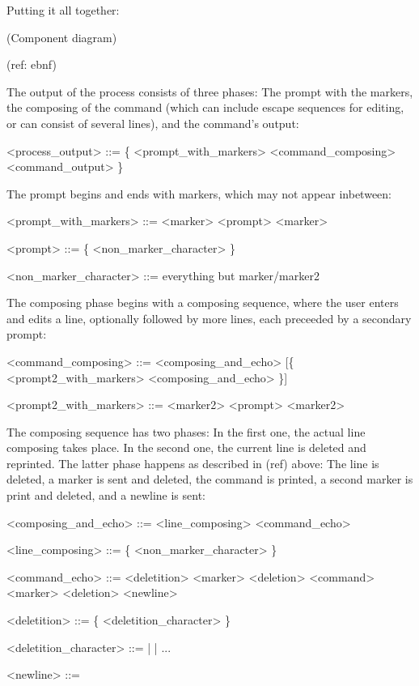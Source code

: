\documentclass[twoside,parskip]{scrreprt}
\begin{document}
Putting it all together:

(Component diagram)

(ref: ebnf)


The output of the process consists of three phases: The prompt with the markers, the composing of the command (which can include escape sequences for editing, or can consist of several lines), and the command's output:

\begin{grammar}
<process_output> ::= \{ <prompt_with_markers> <command_composing> <command_output> \}
\end{grammar}

The prompt begins and ends with markers, which may not appear inbetween:

\begin{grammar}
<prompt_with_markers> ::= <marker> <prompt> <marker>

<prompt> ::= \{ <non_marker_character> \}

<non_marker_character> ::= everything but marker/marker2
\end{grammar}

The composing phase begins with a composing sequence, where the user enters and edits a line, optionally followed by more lines, each preceeded by a secondary prompt:

\begin{grammar}
<command_composing> ::= <composing_and_echo> [\{ <prompt2_with_markers> <composing_and_echo> \}]

<prompt2_with_markers> ::= <marker2> <prompt> <marker2>
\end{grammar}

The composing sequence has two phases: In the first one, the actual line composing takes place. In the second one, the current line is deleted and reprinted. The latter phase happens as described in (ref) above: The line is deleted, a marker is sent and deleted, the command is printed, a second marker is print and deleted, and a newline is sent:

\begin{grammar}
<composing_and_echo> ::= <line_composing> <command_echo>

<line_composing> ::= \{ <non_marker_character> \}

<command_echo> ::= <deletition> <marker> <deletion> <command> <marker> <deletion> <newline>

<deletition> ::= \{ <deletition_character> \}

<deletition_character> ::=  |  | ...

<newline> ::= 
\end{grammar}
\end{document}
